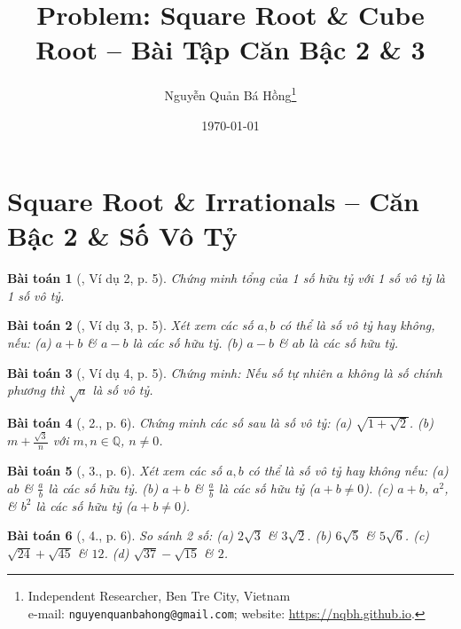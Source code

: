 \documentclass{article}
\title{Problem: Square Root \& Cube Root -- Bài Tập Căn Bậc 2 \& 3}
\author{Nguyễn Quản Bá Hồng\footnote{Independent Researcher, Ben Tre City, Vietnam\\e-mail: \texttt{nguyenquanbahong@gmail.com}; website: \url{https://nqbh.github.io}.}}
\date{\today}
\newtheorem{baitoan}{Bài toán}
\begin{document}
\maketitle
\begin{abstract}
	
\end{abstract}
\tableofcontents


\section{Square Root \& Irrationals -- Căn Bậc 2 \& Số Vô Tỷ}

\begin{baitoan}[\cite{Binh_Toan_9_tap_1}, Ví dụ 2, p. 5]
	Chứng minh tổng của 1 số hữu tỷ với 1 số vô tỷ là 1 số vô tỷ.
\end{baitoan}

\begin{baitoan}[\cite{Binh_Toan_9_tap_1}, Ví dụ 3, p. 5]
	Xét xem các số $a,b$ có thể là số vô tỷ hay không, nếu: (a) $a + b$ \& $a - b$ là các số hữu tỷ. (b) $a - b$ \& $ab$ là các số hữu tỷ.
\end{baitoan}

\begin{baitoan}[\cite{Binh_Toan_9_tap_1}, Ví dụ 4, p. 5]
	Chứng minh: Nếu số tự nhiên $a$ không là số chính phương thì $\sqrt{a}$ là số vô tỷ.
\end{baitoan}

\begin{baitoan}[\cite{Binh_Toan_9_tap_1}, 2., p. 6]
	Chứng minh các số sau là số vô tỷ: (a) $\sqrt{1 + \sqrt{2}}$. (b) $m + \frac{\sqrt{3}}{n}$ với $m,n\in\mathbb{Q}$, $n\ne0$.
\end{baitoan}

\begin{baitoan}[\cite{Binh_Toan_9_tap_1}, 3., p. 6]
	Xét xem các số $a,b$ có thể là số vô tỷ hay không nếu: (a) $ab$ \& $\frac{a}{b}$ là các số hữu tỷ. (b) $a + b$ \& $\frac{a}{b}$ là các số hữu tỷ ($a + b\ne0$). (c) $a + b$, $a^2$, \& $b^2$ là các số hữu tỷ ($a + b\ne0$).
\end{baitoan}

\begin{baitoan}[\cite{Binh_Toan_9_tap_1}, 4., p. 6]
	So sánh 2 số: (a) $2\sqrt{3}$ \& $3\sqrt{2}$. (b) $6\sqrt{5}$ \& $5\sqrt{6}$. (c) $\sqrt{24} + \sqrt{45}$ \& $12$. (d) $\sqrt{37} - \sqrt{15}$ \& $2$.
\end{baitoan}
\end{document}
